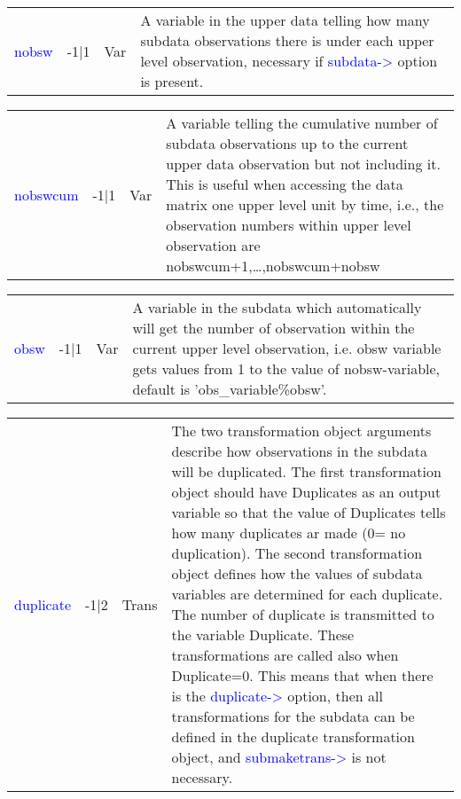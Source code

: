 \begin{table}[H]
\begin{tabular}{ m{}  m{}m{}p{}}
 \textcolor{blue}{nobsw} & -1|1 &Var& A variable in the upper data telling how many subdata observations there is under
 each upper level observation, necessary if \textcolor{blue}{subdata->} option is present.

\\ \cline{1-4}
\end{tabular}
\end{table}
\vspace{-1.51em}
\begin{table}[H]
\begin{tabular}{ m{}  m{}m{}p{}}
 \textcolor{blue}{nobswcum}&-1|1&Var& A variable telling the cumulative number of subdata observations up to the
 current upper data observation but not including it. This is useful when accessing
 the data matrix one upper level unit by time, i.e., the observation numbers within
 upper level observation are nobswcum+1,…,nobswcum+nobsw

\\ \cline{1-4}
\end{tabular}
\end{table}
\vspace{-1.51em}
\begin{table}[H]
\begin{tabular}{ m{}  m{}m{}p{}}
 \textcolor{blue}{obsw}&-1|1& Var & A variable in the subdata which automatically will get the number of observation
 within the current upper level observation, i.e. obsw variable gets values from 1
 to the value of nobsw-variable, default is 'obs\_variable\%obsw'.

\\ \cline{1-4}
\end{tabular}
\end{table}
\vspace{-1.51em}
\begin{table}[H]
\begin{tabular}{ m{}  m{}m{}p{}}
 \textcolor{blue}{duplicate}&-1|2& Trans &
 The two transformation object arguments describe how observations in the subdata
 will be duplicated. The first transformation object should have Duplicates as an
 output variable so that the value of Duplicates tells how many duplicates ar
 made (0= no duplication). The second transformation object defines how the values
 of subdata variables are determined for each duplicate. The number of duplicate
 is transmitted to the variable Duplicate. These transformations are called also
 when Duplicate=0. This means that when there is the \textcolor{blue}{duplicate->} option,
 then all transformations for the subdata can be defined in the duplicate
 transformation object, and \textcolor{blue}{submaketrans->} is not necessary.

\\ \cline{1-4}
\end{tabular}
\end{table}
